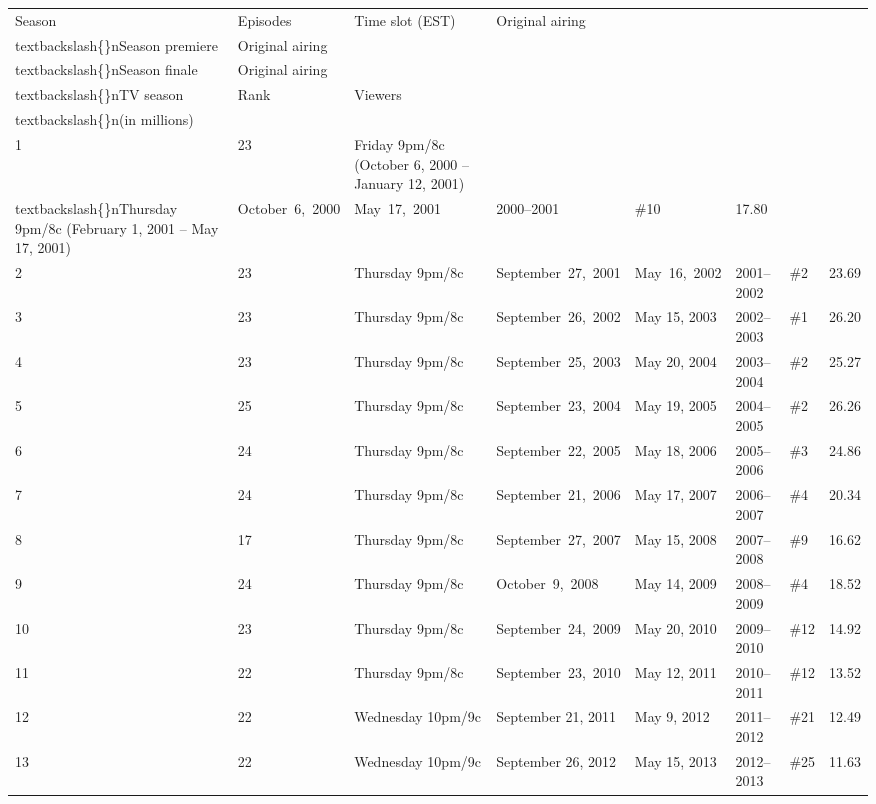 \documentclass{article}
\begin{document}
\begin{tabular}{llllllll}
\toprule
Season & Episodes & Time slot (EST) & Original airing\\textbackslash\{\}nSeason premiere & Original airing\\textbackslash\{\}nSeason finale & Original airing\\textbackslash\{\}nTV season & Rank & Viewers\\textbackslash\{\}n(in millions) \\
\midrule
1 & 23 & Friday 9pm/8c (October 6, 2000 – January 12, 2001)\\textbackslash\{\}nThursday 9pm/8c (February 1, 2001 – May 17, 2001) & October 6, 2000 & May 17, 2001 & 2000–2001 & \#10 & 17.80 \\
2 & 23 & Thursday 9pm/8c & September 27, 2001 & May 16, 2002 & 2001–2002 & \#2 & 23.69 \\
3 & 23 & Thursday 9pm/8c & September 26, 2002 & May 15, 2003 & 2002–2003 & \#1 & 26.20 \\
4 & 23 & Thursday 9pm/8c & September 25, 2003 & May 20, 2004 & 2003–2004 & \#2 & 25.27 \\
5 & 25 & Thursday 9pm/8c & September 23, 2004 & May 19, 2005 & 2004–2005 & \#2 & 26.26 \\
6 & 24 & Thursday 9pm/8c & September 22, 2005 & May 18, 2006 & 2005–2006 & \#3 & 24.86 \\
7 & 24 & Thursday 9pm/8c & September 21, 2006 & May 17, 2007 & 2006–2007 & \#4 & 20.34 \\
8 & 17 & Thursday 9pm/8c & September 27, 2007 & May 15, 2008 & 2007–2008 & \#9 & 16.62 \\
9 & 24 & Thursday 9pm/8c & October 9, 2008 & May 14, 2009 & 2008–2009 & \#4 & 18.52 \\
10 & 23 & Thursday 9pm/8c & September 24, 2009 & May 20, 2010 & 2009–2010 & \#12 & 14.92 \\
11 & 22 & Thursday 9pm/8c & September 23, 2010 & May 12, 2011 & 2010–2011 & \#12 & 13.52 \\
12 & 22 & Wednesday 10pm/9c & September 21, 2011 & May 9, 2012 & 2011–2012 & \#21 & 12.49 \\
13 & 22 & Wednesday 10pm/9c & September 26, 2012 & May 15, 2013 & 2012–2013 & \#25 & 11.63 \\
\bottomrule
\end{tabular}
\end{document}
